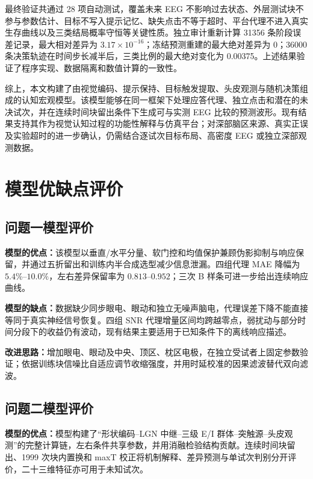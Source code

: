 \documentclass[a4paper]{ctexart}
\numberwithin{figure}{section}       %
\begin{document}
最终验证共通过 28 项自动测试，覆盖未来 EEG 不影响过去状态、外层测试块不参与参数估计、目标不写入提示记忆、缺失点击不等于超时、平台代理不进入真实生存曲线以及三类结局概率守恒等关键性质。独立审计重新计算 31356 条阶段误差记录，最大相对差异为 $3.17\times10^{-16}$；冻结预测重建的最大绝对差异为 0；36000 条决策轨迹在时间步长减半后，三类比例的最大绝对变化为 0.00375。上述结果验证了程序实现、数据隔离和数值计算的一致性。

综上，本文构建了由视觉编码、提示保持、目标触发提取、头皮观测与随机决策组成的认知宏观模型。该模型能够在同一框架下处理应答代理、独立点击和潜在的未决试次，并在连续时间块留出条件下生成可与实测 EEG 比较的预测波形。现有结果支持其作为视觉认知过程的功能性解释与仿真平台；对深部脑区来源、真实正误及实验超时的进一步确认，仍需结合逐试次目标布局、高密度 EEG 或独立深部观测数据。



\newpage
\section{模型优缺点评价}
\subsection{问题一模型评价}

\textbf{模型的优点：}该模型以垂直/水平分量、软门控和均值保护兼顾伪影抑制与响应保留，并通过五折留出和训练内半合成选型减少信息泄漏。四组代理 MAE 降幅为 $5.4\%$--$10.0\%$，左右差异保留率为 $0.813$--$0.952$；三次 B 样条可进一步给出连续响应曲线。

\textbf{模型的缺点：}数据缺少同步眼电、眼动和独立无噪声脑电，代理误差下降不能直接等同于真实神经信号恢复。四组 SNR 代理增量区间均跨越零点，弱扰动与部分时间分段下的收益仍有波动，现有结果主要适用于已知条件下的离线响应描述。

\textbf{改进思路：}增加眼电、眼动及中央、顶区、枕区电极，在独立受试者上固定参数验证；依据训练块信噪比自适应调节收缩强度，并用时延校准的因果滤波替代双向滤波。

\subsection{问题二模型评价}

\textbf{模型的优点：}模型构建了“形状编码--LGN 中继--三级 E/I 群体--突触源--头皮观测”的完整计算链，左右条件共享参数，并用消融检验结构贡献。连续时间块留出、1999 次块内置换和 maxT 校正将机制解释、差异预测与单试次判别分开评价，二十三维特征亦可用于未知试次。
\end{document}

